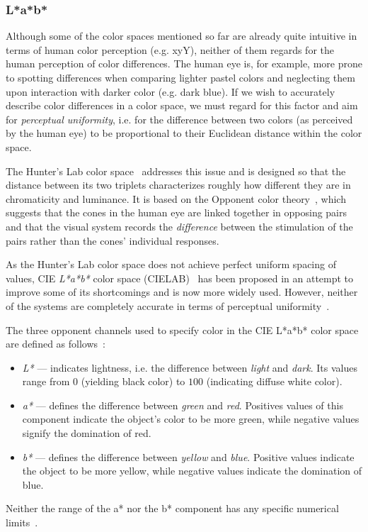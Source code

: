\subsubsection{L*a*b*}

Although some of the color spaces mentioned so far are already quite intuitive in terms of human color perception (e.g. xyY), neither of them regards for the human perception of color differences. The human eye is, for example, more prone to spotting differences when comparing lighter pastel colors and neglecting them upon interaction with darker color (e.g. dark blue). If we wish to accurately describe color differences in a color space, we must regard for this factor and aim for \emph{perceptual uniformity}, i.e. for the difference between two colors (as perceived by the human eye) to be proportional to their Euclidean distance within the color space.

The Hunter's Lab color space~\cite{hunterLabCIELabComparison} addresses this issue and is designed so that the distance between its two triplets characterizes roughly how different they are in chromaticity and luminance. It is based on the Opponent color theory~\cite{opponentColorTheory}, which suggests that the cones in the human eye are linked together in opposing pairs and that the visual system records the \emph{difference} between the stimulation of the pairs rather than the cones' individual responses.

As the Hunter's Lab color space does not achieve perfect uniform spacing of values, CIE \emph{L*a*b*} color space (CIELAB)~\cite{labColorScale} has been proposed in an attempt to improve some of its shortcomings and is now more widely used. However, neither of the systems are completely accurate in terms of perceptual uniformity~\cite{hunterLabCIELabComparison}.

The three opponent channels used to specify color in the CIE L*a*b* color space are defined as follows~\cite{labColorScale}:
\begin{itemize}
	\item \emph{L*} --- indicates lightness, i.e. the difference between \emph{light} and \emph{dark}. Its values range from $0$ (yielding black color) to $100$ (indicating diffuse white color).
	\item \emph{a*} --- defines the difference between \emph{green} and \emph{red}. Positives values of this component indicate the object's color to be more green, while negative values signify the domination of red.
	\item \emph{b*} --- defines the difference between \emph{yellow} and \emph{blue}. Positive values indicate the object to be more yellow, while negative values indicate the domination of blue.
\end{itemize}
Neither the range of the a* nor the b* component has any specific numerical limits~\cite{labColorScale}.

